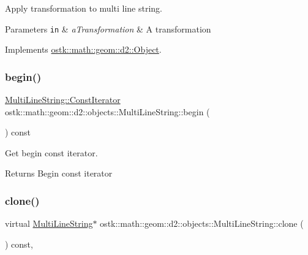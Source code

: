 Apply transformation to multi line string. 


\begin{DoxyParams}[1]{Parameters}
\mbox{\tt in}  & {\em a\+Transformation} & A transformation \\
\hline
\end{DoxyParams}


Implements \hyperlink{classostk_1_1math_1_1geom_1_1d2_1_1_object_a959e50211d7a680f7f904bbb752d75c9}{ostk\+::math\+::geom\+::d2\+::\+Object}.

\mbox{\label{classostk_1_1math_1_1geom_1_1d2_1_1objects_1_1_multi_line_string_a9789bc63ef669a8f625da8f617a605a6}} 
\subsubsection{\texorpdfstring{begin()}{begin()}}
{\footnotesize\ttfamily \hyperlink{classostk_1_1math_1_1geom_1_1d2_1_1objects_1_1_multi_line_string_a43dc9419e5743d8a920141ba4fa10c5f}{Multi\+Line\+String\+::\+Const\+Iterator} ostk\+::math\+::geom\+::d2\+::objects\+::\+Multi\+Line\+String\+::begin (\begin{DoxyParamCaption}{ }\end{DoxyParamCaption}) const}



Get begin const iterator. 

\begin{DoxyReturn}{Returns}
Begin const iterator 
\end{DoxyReturn}
\mbox{\label{classostk_1_1math_1_1geom_1_1d2_1_1objects_1_1_multi_line_string_abf1b39f7e7f9c1f1ba9b040669863e81}} 
\subsubsection{\texorpdfstring{clone()}{clone()}}
{\footnotesize\ttfamily virtual \hyperlink{classostk_1_1math_1_1geom_1_1d2_1_1objects_1_1_multi_line_string}{Multi\+Line\+String}$\ast$ ostk\+::math\+::geom\+::d2\+::objects\+::\+Multi\+Line\+String\+::clone (\begin{DoxyParamCaption}{ }\end{DoxyParamCaption}) const\hspace{0.3cm}{\ttfamily [override]}, {\ttfamily [virtual]}}




